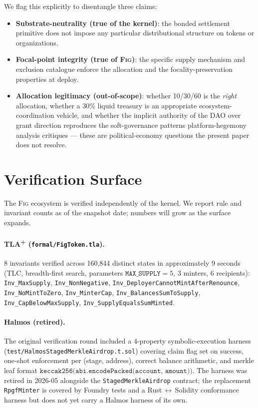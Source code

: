 \documentclass[11pt,a4paper]{article}
\theoremstyle{definition}
\theoremstyle{remark}
\newcommand{\fig}{\textsc{Fig}}
\begin{document}
We flag this explicitly to disentangle three claims:

\begin{itemize}
  \item \textbf{Substrate-neutrality (true of the kernel)}: the
    bonded settlement primitive does not impose any particular
    distributional structure on tokens or organizations.
  \item \textbf{Focal-point integrity (true of \fig{})}: the
    specific supply mechanism and exclusion catalogue enforce
    the allocation and the focality-preservation properties at
    deploy.
  \item \textbf{Allocation legitimacy (out-of-scope)}: whether
    10/30/60 is the \emph{right} allocation, whether a 30\%
    liquid treasury is an appropriate ecosystem-coordination
    vehicle, and whether the implicit authority of the DAO over
    grant direction reproduces the soft-governance patterns
    platform-hegemony analysis critiques --- these are
    political-economy questions the present paper does not
    resolve.
\end{itemize}

\section{Verification Surface}
\label{sec:verification}

The \fig{} ecosystem is verified independently of the kernel.
We report rule and invariant counts as of the snapshot date;
numbers will grow as the surface expands.

\paragraph{TLA\textsuperscript{+} (\texttt{formal/FigToken.tla}).}
8 invariants verified across 160{,}844 distinct states in
approximately 9 seconds (TLC, breadth-first search, parameters
$\texttt{MAX\_SUPPLY}=5$, 3 minters, 6 recipients):
\texttt{Inv\_MaxSupply}, \texttt{Inv\_NonNegative},
\texttt{Inv\_DeployerCannotMintAfterRenounce},
\texttt{Inv\_NoMintToZero}, \texttt{Inv\_MinterCap},
\texttt{Inv\_BalancesSumToSupply},
\texttt{Inv\_CapBelowMaxSupply},
\texttt{Inv\_SupplyEqualsSumMinted}.

\paragraph{Halmos (retired).}
The original verification round included a 4-property
symbolic-execution harness
(\texttt{test/HalmosStagedMerkleAirdrop.t.sol}) covering
claim flag set on success, one-shot enforcement per (stage,
address), correct balance arithmetic, and merkle leaf format
$\texttt{keccak256(abi.encodePacked(account, amount))}$. The
harness was retired in 2026-05 alongside the
\texttt{StagedMerkleAirdrop} contract; the replacement
\texttt{RpgfMinter} is covered by Foundry tests and a
Rust\,$\leftrightarrow$\,Solidity conformance harness but does
not yet carry a Halmos harness of its own.
\end{document}
